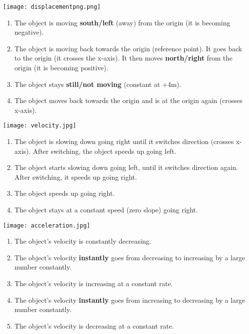 \documentclass[12pt,fleqn]{book} %
\begin{document}
\pagebreak


\begin{multicols}{2}
    \texttt{[image: displacementpng.png]}
    \columnbreak

    \begin{enumerate}[label=(\alph*)]
        \item The object is moving \textbf{south/left} (away) from the origin (it is becoming negative).
        \item The object is moving back towards the origin (reference point). It goes back to the origin (it crosses the x-axis). It then moves
              \textbf{north/right} from the origin (it is becoming positive).
        \item The object stays \textbf{still/not moving} (constant at +4m).
        \item The object moves back towards the origin and is at the origin again (crosses x-axis).
    \end{enumerate}

\end{multicols}

\begin{multicols}{2}
    \texttt{[image: velocity.jpg]}
    \columnbreak

    \begin{enumerate}[label=(\alph*)]
        \item The object is slowing down going right until it switches direction (crosses x-axis). After switching,
              the object speeds up going left.
        \item The object starts slowing down going left, until it switches direction again. After switching, it speeds up going right.
        \item The object speeds up going right.
        \item The object stays at a constant speed (zero slope) going right.
    \end{enumerate}

\end{multicols}

\begin{multicols}{2}
    \texttt{[image: acceleration.jpg]}
    \columnbreak

    \begin{enumerate}[label=(\alph*)]
        \item The object's velocity is constantly decreasing.
        \item The object's velocity \textbf{instantly} goes from decreasing to increasing by a large number constantly.
        \item The object's velocity is increasing at a constant rate.
        \item The object's velocity \textbf{instantly} goes from increasing to decreasing by a large number constantly.
        \item The object's velocity is decreasing at a constant rate.
    \end{enumerate}

\end{multicols}
\end{document}

